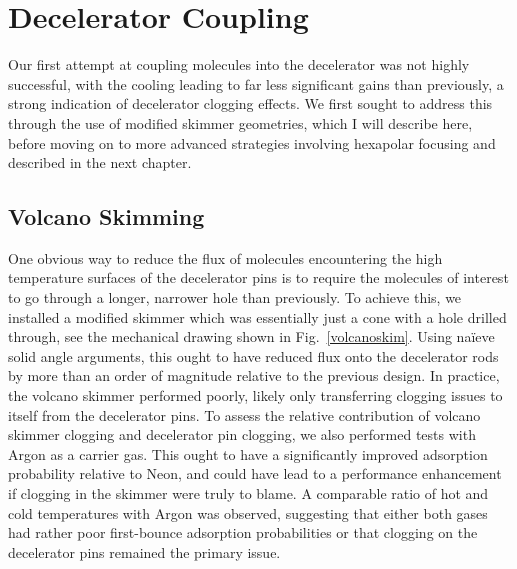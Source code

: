 
\section{Decelerator Coupling}

Our first attempt at coupling molecules into the decelerator was not highly successful, with the cooling leading to far less significant gains than previously, a strong indication of decelerator clogging effects.
We first sought to address this through the use of modified skimmer geometries, which I will describe here, before moving on to more advanced strategies involving hexapolar focusing and described in the next chapter.

\subsection{Volcano Skimming}


One obvious way to reduce the flux of molecules encountering the high temperature surfaces of the decelerator pins is to require the molecules of interest to go through a longer, narrower hole than previously.
To achieve this, we installed a modified skimmer which was essentially just a cone with a hole drilled through, see the mechanical drawing shown in Fig.~\ref{volcanoskim}.
Using na\"ieve solid angle arguments, this ought to have reduced flux onto the decelerator rods by more than an order of magnitude relative to the previous design.
In practice, the volcano skimmer performed poorly, likely only transferring clogging issues to itself from the decelerator pins.
To assess the relative contribution of volcano skimmer clogging and decelerator pin clogging, we also performed tests with Argon as a carrier gas.
This ought to have a significantly improved adsorption probability relative to Neon, and could have lead to a performance enhancement if clogging in the skimmer were truly to blame.
A comparable ratio of hot and cold temperatures with Argon was observed, suggesting that either both gases had rather poor first-bounce adsorption probabilities or that clogging on the decelerator pins remained the primary issue.

